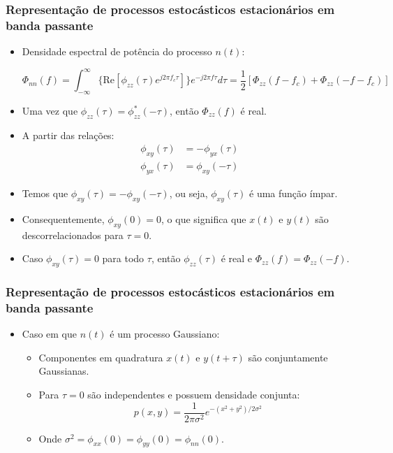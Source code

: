 \begin{frame}
	\frametitle{Representação de processos estocásticos estacionários em banda passante}

	\begin{itemize}
		\item Densidade espectral de potência do processo $n(t)$:
		\begin{small}\begin{equation*}
			\Phi_{nn}(f) = \int_{-\infty}^{\infty}\{\mathrm{Re}[\phi_{zz}(\tau)e^{j2\pi f_c \tau}]\}e^{-j2\pi f \tau} d\tau = \frac{1}{2}[\Phi_{zz}(f-f_c)+\Phi_{zz}(-f-f_c)]
		\end{equation*}		               \end{small}
 		\item Uma vez que $\phi_{zz}(\tau) = \phi_{zz}^*(-\tau)$,  então $\Phi_{zz}(f)$ é real.
		\item A partir das relações:
		\vspace{-0.1cm}\begin{align*}
			\phi_{xy}(\tau) &= -\phi_{yx}(\tau) \\
			\phi_{yx}(\tau) &= \phi_{xy}(-\tau)
		\end{align*}
 		\item Temos que $\phi_{xy}(\tau) = -\phi_{xy}(-\tau)$,  ou seja, $\phi_{xy}(\tau)$ é uma função ímpar.
		\item Consequentemente, $\phi_{xy}(0) = 0$, o que significa que $x(t)$ e $y(t)$ são descorrelacionados para $\tau=0$.
		\item Caso $\phi_{xy}(\tau) = 0$ para todo $\tau$,  então $\phi_{zz}(\tau)$ é real e $\Phi_{zz}(f) = \Phi_{zz}(-f)$.
	\end{itemize}

\end{frame}

\begin{frame}
	\frametitle{Representação de processos estocásticos estacionários em banda passante}

	\begin{itemize}
		\item Caso em que $n(t)$ é um processo Gaussiano:
		\begin{itemize}
			\item Componentes em quadratura $x(t)$ e $y(t+\tau)$ são conjuntamente Gaussianas.
			\item Para $\tau=0$ são independentes e possuem densidade conjunta:
			\begin{equation*}
				p(x,y) = \frac{1}{2\pi \sigma^2}e^{-(x^2+y^2)/2\sigma^2}
			\end{equation*}
			\item Onde $\sigma^2 = \phi_{xx}(0) = \phi_{yy}(0) = \phi_{nn}(0)$.
		\end{itemize}
	\end{itemize}

\end{frame}


